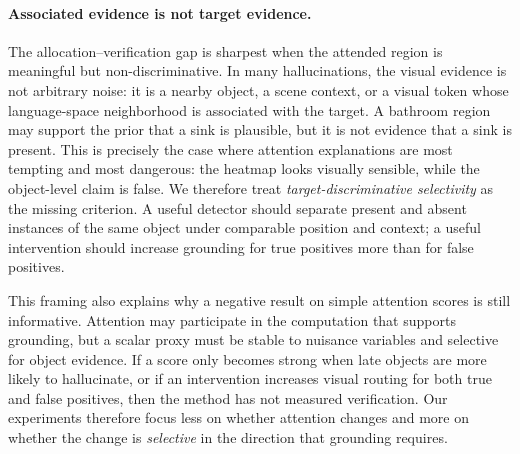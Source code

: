 \paragraph{Associated evidence is not target evidence.} The allocation--verification gap is sharpest when the attended region is meaningful but non-discriminative. In many hallucinations, the visual evidence is not arbitrary noise: it is a nearby object, a scene context, or a visual token whose language-space neighborhood is associated with the target. A bathroom region may support the prior that a sink is plausible, but it is not evidence that a sink is present. This is precisely the case where attention explanations are most tempting and most dangerous: the heatmap looks visually sensible, while the object-level claim is false. We therefore treat \emph{target-discriminative selectivity} as the missing criterion. A useful detector should separate present and absent instances of the same object under comparable position and context; a useful intervention should increase grounding for true positives more than for false positives.

This framing also explains why a negative result on simple attention scores is still informative. Attention may participate in the computation that supports grounding, but a scalar proxy must be stable to nuisance variables and selective for object evidence. If a score only becomes strong when late objects are more likely to hallucinate, or if an intervention increases visual routing for both true and false positives, then the method has not measured verification. Our experiments therefore focus less on whether attention changes and more on whether the change is \emph{selective} in the direction that grounding requires.
